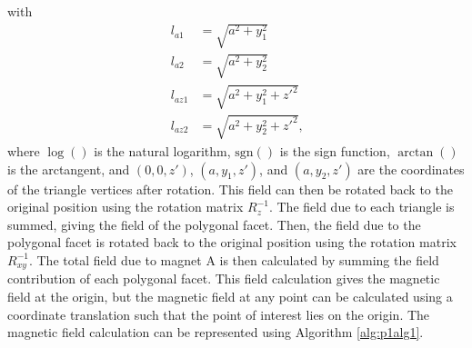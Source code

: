 \noindent with
\begin{align*}
l_{a1} &= \sqrt{a^2+y_1^2} \nonumber \\
l_{a2} &= \sqrt{a^2+y_2^2} \nonumber \\
l_{az1} &= \sqrt{a^2+y_1^2+z'^2} \nonumber \\
l_{az2} &= \sqrt{a^2+y_2^2+z'^2} \nonumber \text{,}
\end{align*}
\noindent where \(\log()\) is the natural logarithm, \(\text{sgn}()\) is the sign function, \(\arctan()\) is the arctangent, and \(\left( 0,0,z' \right)\), \(\left( a,y_1,z' \right)\), and \(\left( a,y_2,z' \right)\) are the coordinates of the triangle vertices after rotation. This field can then be rotated back to the original position using the rotation matrix \(R_z^{-1}\). The field due to each triangle is summed, giving the field of the polygonal facet. Then, the field due to the polygonal facet is rotated back to the original position using the rotation matrix \(R_{xy}^{-1}\). The total field due to magnet A is then calculated by summing the field contribution of each polygonal facet. This field calculation gives the magnetic field at the origin, but the magnetic field at any point can be calculated using a coordinate translation such that the point of interest lies on the origin. The magnetic field calculation can be represented using Algorithm \ref{alg:p1alg1}.
